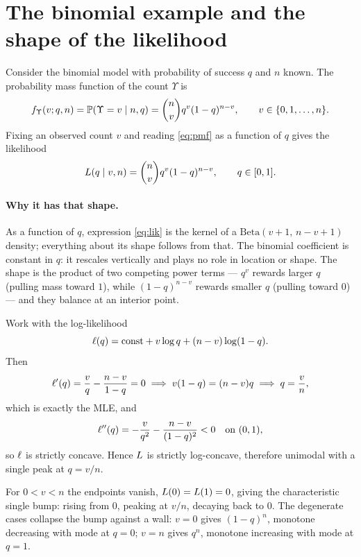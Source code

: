 \section{The binomial example and the shape of the likelihood}
\label{sec:binomial-shape}

Consider the binomial model with probability of success $q$ and $n$ known. The
probability mass function of the count $\Upsilon$ is
\begin{equation}
  f_\Upsilon(v; q, n) = \mathbb{P}(\Upsilon = v \mid n, q)
  = \binom{n}{v} q^v (1-q)^{n-v},
  \qquad v \in \{0,1,\dots,n\}.
  \label{eq:pmf}
\end{equation}
Fixing an observed count $v$ and reading \eqref{eq:pmf} as a function of $q$ gives
the likelihood
\begin{equation}
  L(q \mid v, n) = \binom{n}{v} q^v (1-q)^{n-v},
  \qquad q \in [0,1].
  \label{eq:lik}
\end{equation}

\paragraph{Why it has that shape.}
As a function of $q$, expression \eqref{eq:lik} is the kernel of a
$\mathrm{Beta}(v+1,\, n-v+1)$ density; everything about its shape follows from
that. The binomial coefficient is constant in $q$: it rescales vertically and
plays no role in location or shape. The shape is the product of two competing
power terms --- $q^v$ rewards larger $q$ (pulling mass toward $1$), while
$(1-q)^{n-v}$ rewards smaller $q$ (pulling toward $0$) --- and they balance at
an interior point.

Work with the log-likelihood
\begin{equation}
  \ell(q) = \text{const} + v\log q + (n-v)\log(1-q).
\end{equation}
Then
\begin{equation}
  \ell'(q) = \frac{v}{q} - \frac{n-v}{1-q} = 0
  \;\Longrightarrow\; v(1-q) = (n-v)q
  \;\Longrightarrow\; q = \frac{v}{n},
\end{equation}
which is exactly the MLE, and
\begin{equation}
  \ell''(q) = -\frac{v}{q^2} - \frac{n-v}{(1-q)^2} < 0
  \quad \text{on } (0,1),
\end{equation}
so $\ell$ is strictly concave. Hence $L$ is strictly log-concave,
therefore unimodal with a single peak at $q = v/n$.

For $0 < v < n$ the endpoints vanish, $L(0) = L(1) = 0$, giving the
characteristic single bump: rising from $0$, peaking at $v/n$, decaying back to
$0$. The degenerate cases collapse the bump against a wall: $v = 0$ gives
$(1-q)^n$, monotone decreasing with mode at $q = 0$; $v = n$ gives $q^n$,
monotone increasing with mode at $q = 1$.

